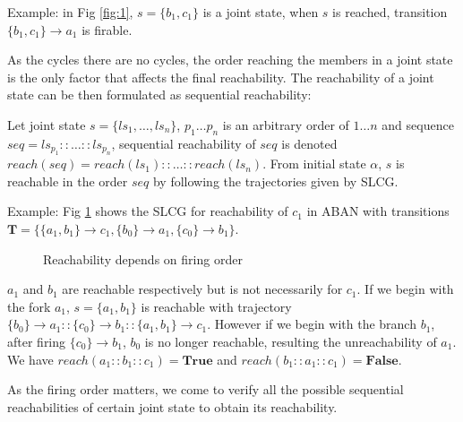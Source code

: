 \documentclass[runningheads]{llncs}
\newcommand{\acm}[3]{\{#1\}\rightarrow#3}
\newcommand{\ac}[3]{$\{#1\}\rightarrow#3$}
\begin{document}
Example: in Fig \ref{fig:1}, $s=\{ b_1,c_1\}$ is a joint state, when $s$ is reached, transition \ac{b_1,c_1}{a_0}{a_1} is firable.

As the cycles there are no cycles, the order reaching the members in a joint state is the only factor that affects the final reachability. 
The reachability of a joint state can be then formulated as sequential reachability:
\begin{definition}
Let joint state $s=\{ls_1,\ldots,ls_n\}$, $p_1\ldots p_n$ is an arbitrary order of $1\ldots n$ and sequence $seq=ls_{p_1}::\ldots::ls_{p_n}$, sequential reachability of $seq$ is denoted $reach (seq)=reach (ls_1)::\ldots::reach (ls_n)$.
From initial state $\alpha$, $s$ is reachable in the order $seq$ by following the trajectories given by SLCG.
\end{definition}

Example: Fig \ref{fig:5} shows the SLCG for reachability of $c_1$ in ABAN with transitions $\mathbf{T}=\{\acm{a_1,b_1}{c_0}{c_1},\acm{b_0}{a_0}{a_1},\acm{c_0}{b_0}{b_1}\}$.
\begin{figure}[ht]
\centering

\caption{Reachability depends on firing order}
\label{fig:5}
\end{figure}

$a_1$ and $b_1$ are reachable respectively but is not necessarily for $c_1$.
If we begin with the fork $a_1$, $s=\{a_1,b_1\}$ is reachable with trajectory $\acm{b_0}{a_0}{a_1}::\acm{c_0}{b_0}{b_1}::\acm{a_1,b_1}{c_0}{c_1}$. 
However if we begin with the branch $b_1$, after firing $\acm{c_0}{b_0}{b_1}$, $b_0$ is no longer reachable, resulting the unreachability of $a_1$.
We have $reach (a_1::b_1::c_1)=\mathbf{True}$ and $reach (b_1::a_1::c_1)=\mathbf{False}$.

As the firing order matters, we come to verify all the possible sequential reachabilities of certain joint state to obtain its reachability.
\end{document}
